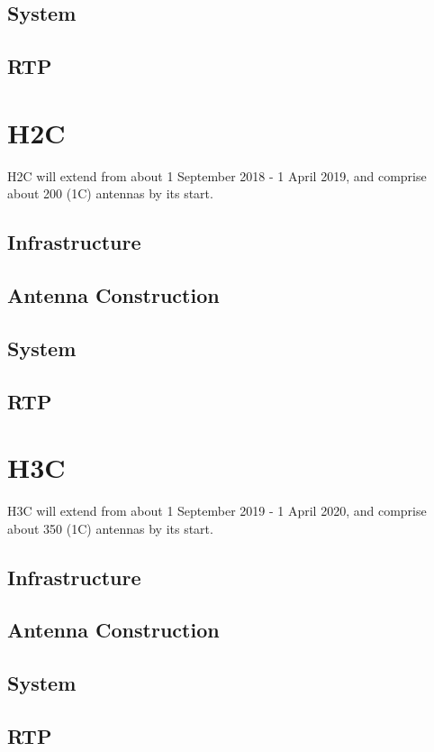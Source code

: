 \documentclass{article}
\begin{document}
\subsection{System}

\subsection{RTP}


\section{H2C}
H2C will extend from about 1 September 2018 - 1 April 2019, and comprise about 200 (1C) antennas by its start.

\subsection{Infrastructure}

\subsection{Antenna Construction}

\subsection{System}

\subsection{RTP}

\section{H3C}
H3C will extend from about 1 September 2019 - 1 April 2020, and comprise about 350 (1C) antennas by its start.

\subsection{Infrastructure}

\subsection{Antenna Construction}

\subsection{System}

\subsection{RTP}
\end{document}
